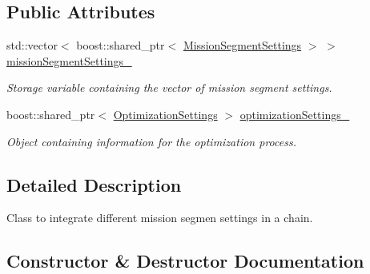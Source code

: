 \subsection*{Public Attributes}
\begin{DoxyCompactItemize}
\item 
std\+::vector$<$ boost\+::shared\+\_\+ptr$<$ \hyperlink{structtudat_1_1optimization_1_1MissionSegmentSettings}{Mission\+Segment\+Settings} $>$ $>$ \hyperlink{structtudat_1_1optimization_1_1MissionLinker_a12b0cb26938522dede2a23362bddb52e}{mission\+Segment\+Settings\+\_\+}\hypertarget{structtudat_1_1optimization_1_1MissionLinker_a12b0cb26938522dede2a23362bddb52e}{}\label{structtudat_1_1optimization_1_1MissionLinker_a12b0cb26938522dede2a23362bddb52e}

\begin{DoxyCompactList}\small\item\em Storage variable containing the vector of mission segment settings. \end{DoxyCompactList}\item 
boost\+::shared\+\_\+ptr$<$ \hyperlink{structtudat_1_1optimization_1_1OptimizationSettings}{Optimization\+Settings} $>$ \hyperlink{structtudat_1_1optimization_1_1MissionLinker_a2d723fb40bf8d098e485696ba1ed0c7f}{optimization\+Settings\+\_\+}\hypertarget{structtudat_1_1optimization_1_1MissionLinker_a2d723fb40bf8d098e485696ba1ed0c7f}{}\label{structtudat_1_1optimization_1_1MissionLinker_a2d723fb40bf8d098e485696ba1ed0c7f}

\begin{DoxyCompactList}\small\item\em Object containing information for the optimization process. \end{DoxyCompactList}\end{DoxyCompactItemize}


\subsection{Detailed Description}
Class to integrate different mission segmen settings in a chain. 

\subsection{Constructor \& Destructor Documentation}
